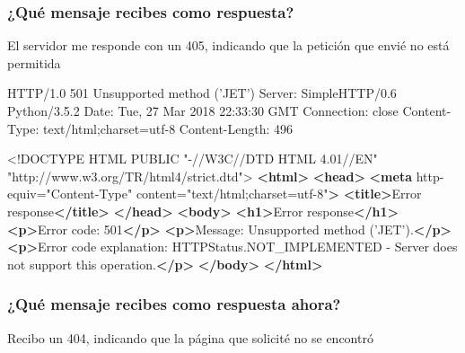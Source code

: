 \documentclass[11pt]{article}
\newenvironment{Shaded}{}{}
\newcommand{\KeywordTok}[1]{\textcolor[rgb]{0.00,0.44,0.13}{\textbf{{#1}}}}
\newcommand{\DataTypeTok}[1]{\textcolor[rgb]{0.56,0.13,0.00}{{#1}}}
\newcommand{\StringTok}[1]{\textcolor[rgb]{0.25,0.44,0.63}{{#1}}}
\newcommand{\OtherTok}[1]{\textcolor[rgb]{0.00,0.44,0.13}{{#1}}}
\newcommand{\NormalTok}[1]{{#1}}
\begin{document}
    \hypertarget{quuxe9-mensaje-recibes-como-respuesta}{%
\subsubsection{¿Qué mensaje recibes como
respuesta?}\label{quuxe9-mensaje-recibes-como-respuesta}}

El servidor me responde con un 405, indicando que la petición que envié
no está permitida

\begin{Shaded}
\begin{Highlighting}[]
\NormalTok{HTTP/1.0 501 Unsupported method ('JET')}
\NormalTok{Server: SimpleHTTP/0.6 Python/3.5.2}
\NormalTok{Date: Tue, 27 Mar 2018 22:33:30 GMT}
\NormalTok{Connection: close}
\NormalTok{Content-Type: text/html;charset=utf-8}
\NormalTok{Content-Length: 496}

\DataTypeTok{<!DOCTYPE }\NormalTok{HTML PUBLIC "-//W3C//DTD HTML 4.01//EN"}
\NormalTok{        "http://www.w3.org/TR/html4/strict.dtd"}\DataTypeTok{>}
\KeywordTok{<html>}
    \KeywordTok{<head>}
        \KeywordTok{<meta}\OtherTok{ http-equiv=}\StringTok{"Content-Type"}\OtherTok{ content=}\StringTok{"text/html;charset=utf-8"}\KeywordTok{>}
        \KeywordTok{<title>}\NormalTok{Error response}\KeywordTok{</title>}
    \KeywordTok{</head>}
    \KeywordTok{<body>}
        \KeywordTok{<h1>}\NormalTok{Error response}\KeywordTok{</h1>}
        \KeywordTok{<p>}\NormalTok{Error code: 501}\KeywordTok{</p>}
        \KeywordTok{<p>}\NormalTok{Message: Unsupported method ('JET').}\KeywordTok{</p>}
        \KeywordTok{<p>}\NormalTok{Error code explanation: HTTPStatus.NOT_IMPLEMENTED - Server does not support this operation.}\KeywordTok{</p>}
    \KeywordTok{</body>}
\KeywordTok{</html>}
\end{Highlighting}
\end{Shaded}

\hypertarget{quuxe9-mensaje-recibes-como-respuesta-ahora}{%
\subsubsection{¿Qué mensaje recibes como respuesta
ahora?}\label{quuxe9-mensaje-recibes-como-respuesta-ahora}}

Recibo un 404, indicando que la página que solicité no se encontró
\end{document}
